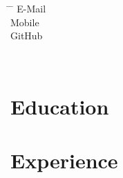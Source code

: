 \documentclass[12pt]{report} %
\begin{document}







\begin{minipage}{0.45\textwidth}
\begin{tabbing}
\hspace{3cm} \= \hspace{4cm} \= \kill %
E-Mail  \> \href{mailto:\varEmail}{\varEmail} \\
Mobile  \> \varMobile \\
\DoIfNotEmpty{\varGithub}
{GitHub \> \href{\varGithub}{\varGithub} \\}%
\end{tabbing}
\end{minipage}%
\hfill
\begin{minipage}{0.3\textwidth}%
\varAddress \\%
\end{minipage}%



\section{Education}

\education{}
\begin{list}{}%
         {\setlength{\leftmargin}{0.19\linewidth}}%
         \item[]%
{\small{\color{gray}\varEducationInfo{}}}
\end{list}



\section{Experience}
\end{document}
